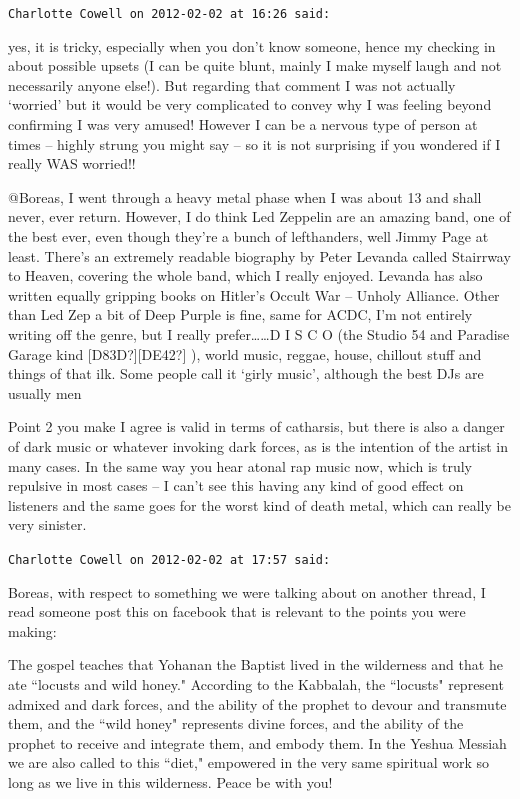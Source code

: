 \begin{footnotesize}
\begin{sffamily}
\hfill

\texttt{Charlotte Cowell on 2012-02-02 at 16:26 said: }

yes, it is tricky, especially when you don't know someone, hence my checking in about possible upsets (I can be quite blunt, mainly I make myself laugh and not necessarily anyone else!). But regarding that comment I was not actually `worried' but it would be very complicated to convey why I was feeling beyond confirming I was very amused! However I can be a nervous type of person at times – highly strung you might say – so it is not surprising if you wondered if I really WAS worried!!

@Boreas, I went through a heavy metal phase when I was about 13 and shall never, ever return. However, I do think Led Zeppelin are an amazing band, one of the best ever, even though they're a bunch of lefthanders, well Jimmy Page at least. There's an extremely readable biography by Peter Levanda called Stairrway to Heaven, covering the whole band, which I really enjoyed. Levanda has also written equally gripping books on Hitler's Occult War – Unholy Alliance. Other than Led Zep a bit of Deep Purple is fine, same for ACDC, I'm not entirely writing off the genre, but I really prefer……D I S C O (the Studio 54 and Paradise Garage kind [D83D?][DE42?] ), world music, reggae, house, chillout stuff and things of that ilk. Some people call it `girly music', although the best DJs are usually men 

Point 2 you make I agree is valid in terms of catharsis, but there is also a danger of dark music or whatever invoking dark forces, as is the intention of the artist in many cases. In the same way you hear atonal rap music now, which is truly repulsive in most cases – I can't see this having any kind of good effect on listeners and the same goes for the worst kind of death metal, which can really be very sinister.


\hfill

\texttt{Charlotte Cowell on 2012-02-02 at 17:57 said: }

Boreas, with respect to something we were talking about on another thread, I read someone post this on facebook that is relevant to the points you were making: 

The gospel teaches that Yohanan the Baptist lived in the wilderness and that he ate ``locusts and wild honey." According to the Kabbalah, the ``locusts" represent admixed and dark forces, and the ability of the prophet to devour and transmute them, and the ``wild honey" represents divine forces, and the ability of the prophet to receive and integrate them, and embody them. In the Yeshua Messiah we are also called to this ``diet," empowered in the very same spiritual work so long as we live in this wilderness. Peace be with you!



\end{sffamily}
\end{footnotesize}
